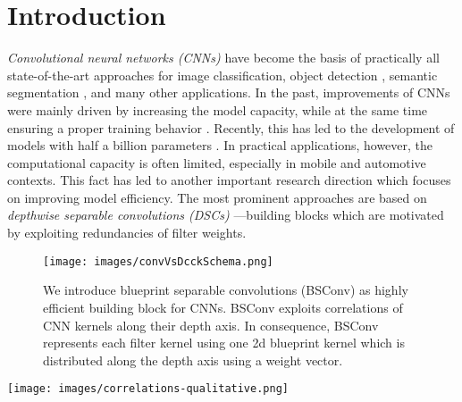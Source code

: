 \documentclass[10pt,twocolumn,letterpaper]{article}
\newcommand{\DCCK}{BSConv\xspace}
\begin{document}
\section{Introduction}
\textit{Convolutional neural networks (CNNs)} \cite{lecun1989backpropagation,krizhevsky2012imagenet} have become the basis of practically all state-of-the-art approaches for image classification, object detection \cite{girshick2014rich}, semantic segmentation \cite{long2015fully}, and many other applications.
In the past, improvements of CNNs were mainly driven by increasing the model capacity, while at the same time ensuring a proper training behavior \cite{ioffe2015batch,he2016deep,he2016identity}.
Recently, this has led to the development of models with half a billion parameters \cite{huang2018gpipe}.
In practical applications, however, the computational capacity is often limited, especially in mobile and automotive contexts.
This fact has led to another important research direction which focuses on improving model efficiency.
The most prominent approaches are based on \textit{depthwise separable convolutions (DSCs)} \cite{sifre2014rigid,howard2017mobilenets}---building blocks which are motivated by exploiting redundancies of filter weights.

\begin{figure}
	\center
	\texttt{[image: images/convVsDcckSchema.png]}
	\caption{We introduce blueprint separable convolutions (\DCCK) as highly efficient building block for CNNs.
		\DCCK exploits correlations of CNN kernels along their depth axis.
		In consequence, \DCCK represents each filter kernel using one 2d blueprint kernel which is distributed along the depth axis using a weight vector.\vspace{-0.2em}
	}
	\label{fig:convVsDcckSchema}
\end{figure}
\begin{figure*}
	\center
	\texttt{[image: images/correlations-qualitative.png]}
	\caption{Exemplary filter weights of a vanilla VGG-19, Inception v2, and ResNet-50 CNN trained on ImageNet.
		For each of the three CNN architectures, \textit{one} filter kernel of size  is visualized, split into 128 images.
		The weights of each filter kernel are highly correlated along the depth axis.
		Concretely, most slices show the same filter-specific  `blueprint', only scaled by different factors (including negative factors which cause `inverted' versions of the blueprint).
		While only three slices are highlighted for each kernel, the correlation is visible for far more slices (52/128 for the ResNet-50 example).
		This observation is the motivation for our proposal of \textit{blueprint separable convolutions (\DCCK)}, which inherently represent a filter kernel of size  using one blueprint kernel of size  and a set of  multiplicative factors used to distribute the blueprint across the depth axis.
	}
     \label{fig:W_a}
\end{figure*}
\end{document}
